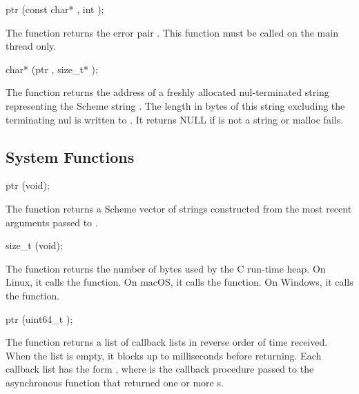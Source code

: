 \begin{function}
  ptr (const char* , int );
\end{function}

The  function returns the error pair
. This function must be called on the
main thread only.

\begin{function}
  char* (ptr , size\_t* );
\end{function}

The  function returns the address of a
freshly allocated nul-terminated string representing the Scheme string
. The length in bytes of this string excluding the terminating
nul is written to . It returns NULL if 
is not a string or malloc fails.

\subsection {System Functions}

\begin{function}
  ptr (void);
\end{function}

The  function returns a Scheme vector of strings
constructed from the most recent arguments passed to
.

\begin{function}
  size\_t (void);
\end{function}

The  function returns the number of bytes
used by the C run-time heap. On Linux, it calls the 
function. On macOS, it calls the  function. On Windows,
it calls the  function.

\begin{function}
  ptr (uint64\_t );
\end{function}

The  function returns a list of callback
lists in reverse order of time received. When the list is empty, it
blocks up to  milliseconds before returning. Each
callback list has the form ,
where  is the callback procedure passed to the
asynchronous function that returned one or more s.

